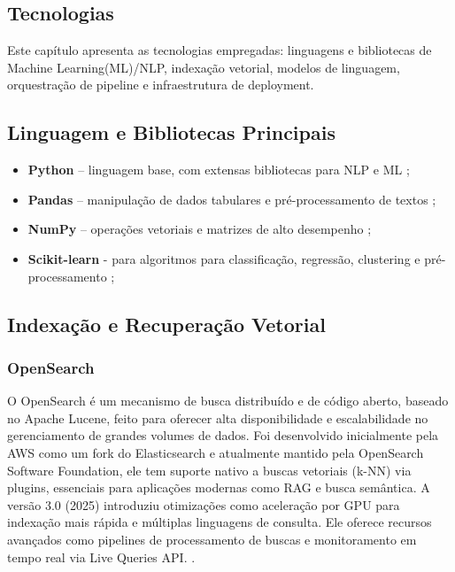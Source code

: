 \begin{description}

\chapter{Tecnologias}

\label{chap:tecnologias}
Este capítulo apresenta as tecnologias empregadas: linguagens e bibliotecas de Machine Learning(ML)/NLP, indexação vetorial, modelos de linguagem, orquestração de pipeline e infraestrutura de deployment.  
\section{Linguagem e Bibliotecas Principais}
\begin{itemize}[label=\textbullet]

\item \textbf{Python} – linguagem base, com extensas bibliotecas para NLP e ML  \cite{python2024reference};
\item \textbf{Pandas} – manipulação de dados tabulares e pré-processamento de textos  \cite{pandas2024};
\item \textbf{NumPy} – operações vetoriais e matrizes de alto desempenho \cite{numpy2025};
\item \textbf{Scikit-learn} - para algoritmos para classificação, regressão, clustering e pré-processamento \cite{scikit-learn};



\end{itemize}

\section{Indexação e Recuperação Vetorial}
\subsection{OpenSearch}
O OpenSearch é um mecanismo de busca distribuído e de código aberto, baseado no Apache Lucene, feito para oferecer alta disponibilidade e escalabilidade no gerenciamento de grandes volumes de dados. Foi desenvolvido inicialmente pela AWS como um fork do Elasticsearch e atualmente mantido pela OpenSearch Software Foundation, ele tem suporte nativo a buscas vetoriais (k-NN) via plugins, essenciais para aplicações modernas como RAG e busca semântica. 
A versão 3.0 (2025) introduziu otimizações como aceleração por GPU para indexação mais rápida e múltiplas linguagens de consulta. Ele oferece recursos avançados como pipelines de processamento de buscas e monitoramento em tempo real via Live Queries API. \cite{taipalus2024vector,opensearch2025}.


\end{description}
